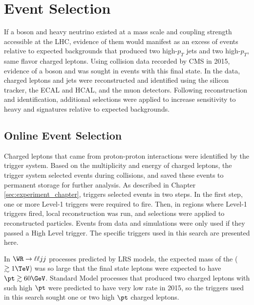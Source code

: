 \chapter{Event Selection}
\label{sec:event_selection_chapter}

If a \WR boson and heavy neutrino \nul existed at a mass scale and coupling strength accessible 
at the LHC, evidence of them would manifest as an excess of events relative to expected backgrounds 
that produced two high-$p_{T}$ jets and two high-$p_{T}$, same flavor charged leptons.  
Using collision data recorded by CMS in 2015, evidence of a \WR boson and \nul was sought in events 
with this final state.  In the data, charged leptons and jets were reconstructed and identified 
using the silicon tracker, the ECAL and HCAL, and the muon detectors.  Following reconstruction 
and identification, additional selections were applied to increase sensitivity to heavy \WR and 
\nul signatures relative to expected backgrounds.

\section{Online Event Selection}
\label{sec:triggers}
Charged leptons that came from proton-proton interactions were identified by the trigger system.  Based 
on the multiplicity and energy of charged leptons, the trigger system selected events during 
collisions, and saved these events to permanent storage for further analysis.  As described in Chapter 
\ref{sec:experiment_chapter}, triggers selected events in two steps.  In the first step, one or more Level-1 triggers were 
required to fire.  Then, in regions where Level-1 triggers fired, local reconstruction was run, and 
selections were applied to reconstructed particles.  Events from data and simulations were only 
used if they passed a High Level trigger.  The specific triggers used in this search are presented 
here.

In $\WR \rightarrow \ell\ell jj$ processes predicted by LRS models, the expected mass of the \WR ($\gtrsim 1 \TeV$) was 
so large that the final state leptons were expected to have $\pt \gtrsim 60 \GeV$.  Standard Model processes that 
produced two charged leptons with such high $\pt$ were predicted to have very low rate in 2015, so the 
triggers used in this search sought one or two high $\pt$ charged leptons.

